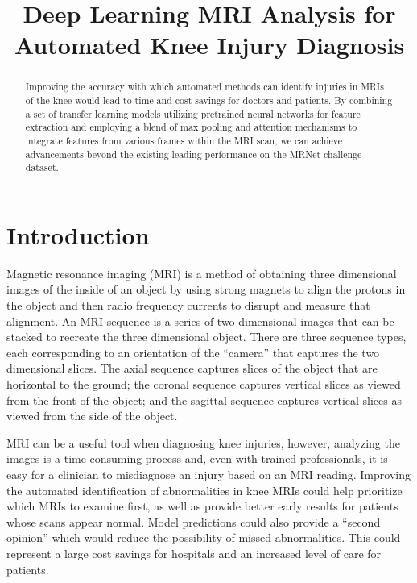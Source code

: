 \documentclass[conference]{IEEEtran}
\begin{document}
\title{Deep Learning MRI Analysis for Automated Knee Injury Diagnosis}
\author{
\and
{}
\and
{}
\and
{}
}

\maketitle

\begin{abstract}
   Improving the accuracy with which automated methods can identify injuries in
   MRIs of the knee would lead to time and cost savings for doctors and patients.
 By combining a set of transfer learning models utilizing pretrained neural networks for feature extraction and employing a blend of max pooling and attention mechanisms to integrate features from various frames within the MRI scan, we can achieve advancements beyond the existing leading performance on the MRNet challenge dataset.
\end{abstract}

\section{Introduction} 

Magnetic resonance imaging (MRI) is a method of obtaining three dimensional images of the inside of an object by using strong magnets to align the protons in the object and then radio frequency currents to disrupt and measure that alignment. An MRI sequence is a series of two dimensional images that can be stacked to recreate the three dimensional object. There are three sequence types, each corresponding to an orientation of the ``camera'' that captures the two dimensional slices. The axial sequence captures slices of the object that are horizontal to the ground; the coronal sequence captures vertical slices as viewed from the front of the object; and the sagittal sequence captures vertical slices as viewed from the side of the object.

MRI can be a useful tool when diagnosing knee injuries\cite{orlando2015diagnosis,figueiredo2018use,smith2012diagnostic}, however, analyzing the images is a time-consuming process and, even with trained professionals, it is easy for a clinician to misdiagnose an injury based on an MRI reading\cite{kolata2011}. Improving the automated identification of abnormalities in knee MRIs could help prioritize which MRIs to examine first, as well as provide better early results for patients whose scans appear normal. Model predictions could also provide a ``second opinion'' which would reduce the possibility of missed abnormalities. This could represent a large cost savings for hospitals and an increased level of care for patients.
\end{document}
